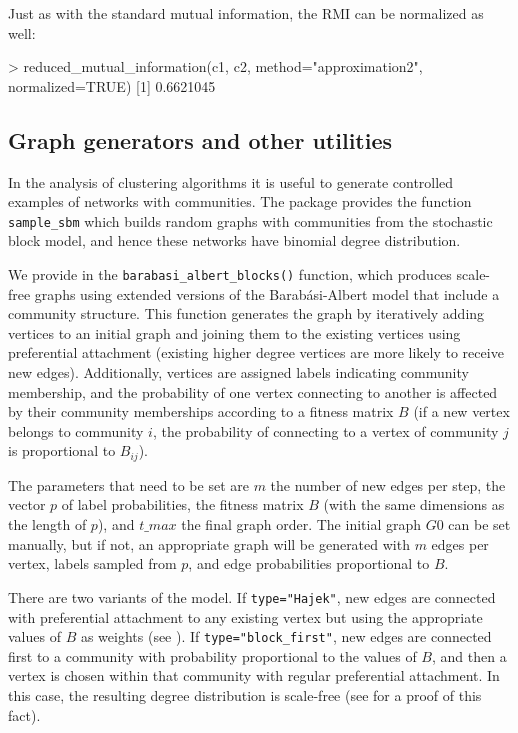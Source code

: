 Just as with the standard mutual information, the RMI can be normalized as well:
\begin{example}
> reduced_mutual_information(c1, c2, method="approximation2", normalized=TRUE)
[1] 0.6621045
\end{example}

\subsection{Graph generators and other utilities}
In the analysis of clustering algorithms it is useful to generate controlled examples of networks with communities. The package 
provides the function {\tt sample\_sbm} which builds random graphs with communities from the stochastic block model, and hence these networks have binomial degree distribution. 

We provide in 
the \texttt{barabasi\_albert\_blocks()} function, which produces scale-free graphs using extended versions of the Barabási-Albert model that include a community structure. 
This function generates the graph by iteratively adding vertices to an initial graph and joining them to the existing vertices using preferential attachment (existing higher degree vertices are more likely to receive new edges). Additionally, vertices are assigned labels indicating community membership, and the probability of one vertex connecting to another is affected by their community memberships according to a fitness matrix $B$ (if a new vertex belongs to community $i$, the probability of connecting to a vertex of community $j$ is proportional to $B_{ij}$).

The parameters that need to be set are $m$ the number of new edges per step, the vector $p$ of label probabilities, the fitness matrix $B$ (with the same dimensions as the length of $p$), and $t\_max$ the final graph order. The initial graph $G0$ can be set manually, but if not, an appropriate graph will be generated with $m$ edges per vertex, labels sampled from $p$, and edge probabilities proportional to $B$.

There are two variants of the model. If \texttt{type="Hajek"}, new edges are connected with preferential attachment to any existing vertex but using the appropriate values of $B$ as weights (see \citep{Hajek2019}). If \texttt{type="block\_first"}, new edges are connected first to a community with probability proportional to the values of $B$, and then a vertex is chosen within that community with regular preferential attachment. In this case, the resulting degree distribution is scale-free (see \citep{bias21} for a proof of this fact).

